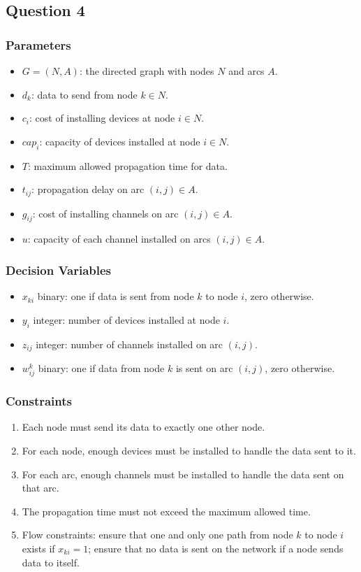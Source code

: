 \subsection*{Question 4}

\subsubsection*{Parameters}

\begin{itemize}
	\item $G = (N, A)$: the directed graph with nodes $N$ and arcs $A$.
	\item $d_k$: data to send from node $k \in N$.
	\item $c_i$: cost of installing devices at node $i \in N$.
	\item $cap_i$: capacity of devices installed at node $i \in N$.
	\item $T$: maximum allowed propagation time for data.
	\item $t_{ij}$: propagation delay on arc $(i, j) \in A$.
	\item $g_{ij}$: cost of installing channels on arc $(i, j) \in A$.
	\item $u$: capacity of each channel installed on arcs $(i, j) \in A$.
\end{itemize}

\subsubsection*{Decision Variables}

\begin{itemize}
	\item $x_{ki}$ binary: one if data is sent from node $k$ to node $i$, zero otherwise.
	\item $y_i$ integer: number of devices installed at node $i$.
	\item $z_{ij}$ integer: number of channels installed on arc $(i, j)$.
	\item $w_{ij}^k$ binary: one if data from node $k$ is sent on arc $(i, j)$, zero otherwise.
\end{itemize}

\subsubsection*{Constraints}

\begin{enumerate}
	\item Each node must send its data to exactly one other node.
	\item For each node, enough devices must be installed to handle the data sent to it.
	\item For each arc, enough channels must be installed to handle the data sent on that arc.
	\item The propagation time must not exceed the maximum allowed time.
	\item Flow constraints: ensure that one and only one path from node $k$ to node $i$ exists if $x_{ki} = 1$; ensure that no data is sent on the network if a node sends data to itself.
\end{enumerate}

